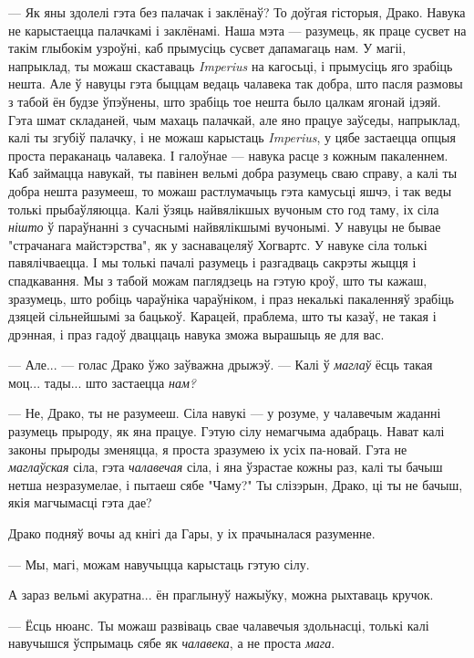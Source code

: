 --- Як яны здолелі гэта без палачак і заклёнаў? То доўгая гісторыя, Драко. Навука
не карыстаецца палачкамі і заклёнамі. Наша мэта --- разумець, як праце сусвет на 
такім глыбокім узроўні, каб прымусіць сусвет дапамагаць нам. У магіі, напрыклад,
ты можаш скаставаць \emph{Imperius} на кагосьці, і прымусіць яго зрабіць нешта.
Але ў навуцы гэта быццам ведаць чалавека так добра, што пасля размовы з табой ён
будзе ўпэўнены, што зрабіць тое нешта было цалкам ягонай ідэяй. Гэта шмат складаней,
чым махаць палачкай, але яно працуе заўседы, напрыклад, калі ты згубіў палачку, 
і не можаш карыстаць  \emph{Imperius}, у цябе застаецца опцыя проста пераканаць
чалавека. І галоўнае --- навука расце з кожным пакаленнем. Каб займацца навукай,
ты павінен вельмі добра разумець сваю справу, а калі ты добра нешта разумееш, то 
можаш растлумачыць гэта камусьці яшчэ, і так веды толькі прыбаўляюцца. 
Калі ўзяць найвялікшых вучоным сто год таму, іх сіла \emph{нішто} ў параўнанні 
з сучаснымі найвялікшымі вучонымі. У навуцы не бывае "страчанага майстэрства",
як у заснавацеляў Хогвартс. У навуке сіла толькі павялічваецца. І мы толькі пачалі 
разумець і разгадваць сакрэты жыцця і спадкавання. Мы з табой можам 
паглядзець на гэтую кроў, што ты кажаш, зразумець, што робіць чараўніка чараўніком,
і праз некалькі пакаленняў зрабіць дзяцей сільнейшымі за бацькоў. Карацей, 
праблема, што ты казаў, не такая і дрэнная, і праз гадоў дваццаць навука зможа 
вырашыць яе для вас. 

--- Але... --- голас Драко ўжо заўважна дрыжэў. --- Калі ў \emph{маглаў} ёсць 
такая моц... тады... што застаецца \emph{нам?}

--- Не, Драко, ты не разумееш. Сіла навукі --- у розуме, у чалавечым жаданні разумець
прыроду, як яна працуе. Гэтую сілу немагчыма адабраць. Нават калі законы 
прыроды зменяцца, я проста зразумею іх усіх па-новай. Гэта не \emph{маглаўская} сіла,
гэта \emph{чалавечая} сіла, і яна ўзрастае кожны раз, калі ты бачыш нетша незразумелае,
і пытаеш сябе "Чаму?" Ты слізэрын, Драко, ці ты не бачыш, якія магчымасці гэта дае?

Драко подняў вочы ад кнігі да Гары, у іх прачыналася разуменне.

--- Мы, магі, можам навучыцца карыстаць гэтую сілу.

А зараз вельмі акуратна... ён праглынуў нажыўку, можна рыхтаваць кручок.

--- Ёсць нюанс. Ты можаш развіваць свае чалавечыя здольнасці, толькі калі навучышся ўспрымаць
сябе як \emph{чалавека}, а не проста \emph{мага}.

